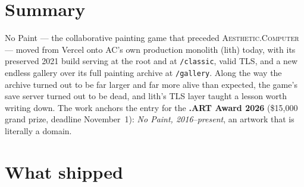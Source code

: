 \documentclass[10pt,letterpaper,twocolumn]{article}
\newcommand{\ac}{\textsc{Aesthetic.Computer}}
\begin{document}

\section{Summary}

No Paint --- the collaborative painting game that preceded \ac{} ---
moved from Vercel onto AC's own production monolith (lith) today, with
its preserved 2021 build serving at the root and at
\texttt{/classic}, valid TLS, and a new endless gallery over its full
painting archive at \texttt{/gallery}. Along the way the archive turned
out to be far larger and far more alive than expected, the game's save
server turned out to be dead, and lith's TLS layer taught a lesson
worth writing down. The work anchors the entry for the
\textbf{.ART Award 2026} (\$15{,}000 grand prize, deadline
November~1): \emph{No Paint, 2016--present}, an artwork that is
literally a domain.

\section{What shipped}
\end{document}
